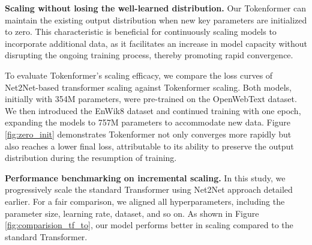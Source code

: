 \documentclass{article} %
\newcommand{\ourmethod}{Tokenformer\xspace}
\begin{document}
\textbf{Scaling without losing the well-learned distribution.} Our \ourmethod can maintain the existing output distribution when new key parameters are initialized to zero. This characteristic is beneficial for continuously scaling models to incorporate additional data, as it facilitates an increase in model capacity without disrupting the ongoing training process, thereby promoting rapid convergence.

To evaluate \ourmethod's scaling efficacy, we compare the loss curves of Net2Net-based transformer scaling against \ourmethod scaling. Both models, initially with 354M parameters, were pre-trained on the OpenWebText dataset. We then introduced the EnWik8 dataset and continued training with one epoch, expanding the models to 757M parameters to accommodate new data. Figure \ref{fig:zero_init} demonstrates \ourmethod not only converges more rapidly but also reaches a lower final loss, attributable to its ability to preserve the output distribution during the resumption of training.

\textbf{Performance benchmarking on incremental scaling.} In this study, we progressively scale the standard Transformer using Net2Net approach detailed earlier. For a fair comparison, we aligned all hyperparameters, including the parameter size, learning rate, dataset, and so on. As shown in Figure \ref{fig:comparision_tf_to}, our model performs better in scaling compared to the standard Transformer.
\end{document}
